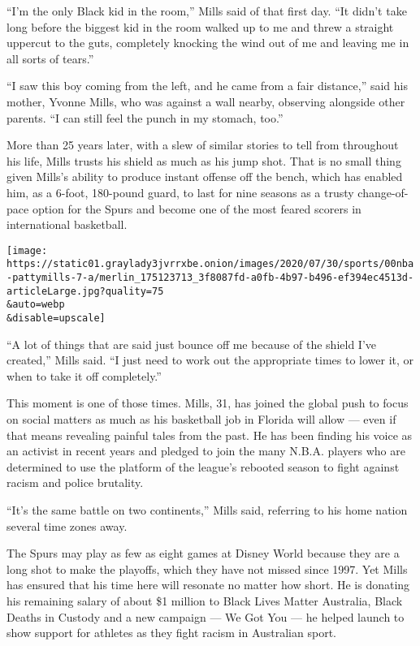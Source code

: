 ``I'm the only Black kid in the room,'' Mills said of that first day.
``It didn't take long before the biggest kid in the room walked up to me
and threw a straight uppercut to the guts, completely knocking the wind
out of me and leaving me in all sorts of tears.''

``I saw this boy coming from the left, and he came from a fair
distance,'' said his mother, Yvonne Mills, who was against a wall
nearby, observing alongside other parents. ``I can still feel the punch
in my stomach, too.''

More than 25 years later, with a slew of similar stories to tell from
throughout his life, Mills trusts his shield as much as his jump shot.
That is no small thing given Mills's ability to produce instant offense
off the bench, which has enabled him, as a 6-foot, 180-pound guard, to
last for nine seasons as a trusty change-of-pace option for the Spurs
and become one of the most feared scorers in international basketball.

\texttt{[image: https://static01.graylady3jvrrxbe.onion/images/2020/07/30/sports/00nba-pattymills-7-a/merlin\_175123713\_3f8087fd-a0fb-4b97-b496-ef394ec4513d-articleLarge.jpg?quality=75\\\&auto=webp\\\&disable=upscale]}

``A lot of things that are said just bounce off me because of the shield
I've created,'' Mills said. ``I just need to work out the appropriate
times to lower it, or when to take it off completely.''

This moment is one of those times. Mills, 31, has joined the global push
to focus on social matters as much as his basketball job in Florida will
allow --- even if that means revealing painful tales from the past. He
has been finding his voice as an activist in recent years and pledged to
join the many N.B.A. players who are determined to use the platform of
the league's rebooted season to fight against racism and police
brutality.

``It's the same battle on two continents,'' Mills said, referring to his
home nation several time zones away.

The Spurs may play as few as eight games at Disney World because they
are a long shot to make the playoffs, which they have not missed since
1997. Yet Mills has ensured that his time here will resonate no matter
how short. He is donating his remaining salary of about \$1 million to
Black Lives Matter Australia, Black Deaths in Custody and a new campaign
--- We Got You --- he helped launch to show support for athletes as they
fight racism in Australian sport.

